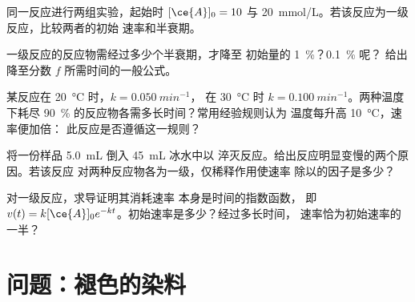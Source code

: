 \begin{exercise}[$\star\star$]\label{exo:g12:reaction-rates:11}
同一反应进行两组实验，起始时 $[\ce{A}]_0 = 10$ 与
\qty{20}{mmol/L}。若该反应为一级反应，比较两者的初始
速率和半衰期。
\end{exercise}

\begin{exercise}[$\star\star\star$]\label{exo:g12:reaction-rates:12}
一级反应的反应物需经过多少个半衰期，才降至
初始量的 \qty{1}{\percent}？\qty{0.1}{\percent} 呢？
给出降至分数 $f$ 所需时间的一般公式。
\end{exercise}

\begin{exercise}[$\star\star\star$]\label{exo:g12:reaction-rates:13}
某反应在 \qty{20}{\celsius} 时，$k = \qty{0.050}{min^{-1}}$，
在 \qty{30}{\celsius} 时 $k = \qty{0.100}{min^{-1}}$。两种温度下耗尽
\qty{90}{\percent} 的反应物各需多长时间？常用经验规则认为
温度每升高 \qty{10}{\celsius}，速率便加倍：
此反应是否遵循这一规则？
\end{exercise}

\begin{exercise}[$\star\star\star$]\label{exo:g12:reaction-rates:14}
将一份样品 \qty{5.0}{mL} 倒入 \qty{45}{mL} 冰水中以
淬灭反应。给出反应明显变慢的两个原因。若该反应
对两种反应物各为一级，仅稀释作用使速率
除以的因子是多少？
\end{exercise}

\begin{exercise}[$\star\star\star$]\label{exo:g12:reaction-rates:15}
对一级反应，求导证明其消耗速率
本身是时间的指数函数，
即 $v(t) = k[\ce{A}]_0 e^{-kt}$。初始速率是多少？经过多长时间，
速率恰为初始速率的一半？
\end{exercise}

\section{问题：褪色的染料}


